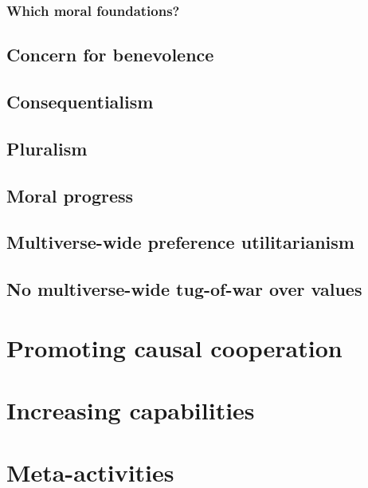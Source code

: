 \documentclass{book}
\begin{document}
\subsubsection{Which moral foundations?}
\label{Which moral foundations?}

\subsection{Concern for benevolence}
\label{Concern for benevolence}

\subsection{Consequentialism}
\label{Consequentialism_2}

\subsection{Pluralism}
\label{Pluralism}

\subsection{Moral progress}
\label{Moral progress}

\subsection{Multiverse-wide preference utilitarianism}
\label{Multiverse-wide preference utilitarianism}

\subsection{No multiverse-wide tug-of-war over values}
\label{No multiverse-wide tug-of-war over values}

\section{Promoting causal cooperation}
\label{Promoting causal cooperation}

\section{Increasing capabilities}
\label{Increasing capabilities}

\section{Meta-activities}
\label{Meta-activities}
\end{document}
